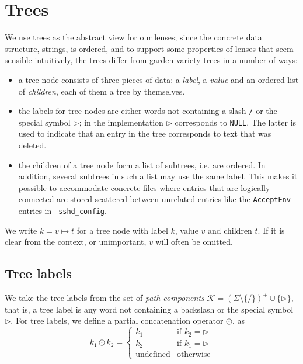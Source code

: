 \documentclass[12pt,fleqn]{amsart}
\newcommand{\ensmath}[1]{\ensuremath{#1}\xspace}
\newcommand{\xconc}[2]{\ensmath{#1\odot #2}}
\newcommand{\tmapv}[3]{\ensmath{#1 = #2\mapsto #3}}
\newcommand{\Keys}{\ensmath{\mathcal{K}}}
\begin{document}
\section{Trees}
We use trees as the abstract view for our lenses; since the concrete data
structure, strings, is ordered, and to support some properties of lenses
that seem sensible intuitively, the trees differ from garden-variety trees
in a number of ways:
\begin{itemize}
  \item a tree node consists of three pieces of data: a \emph{label}, a
    \emph{value} and an ordered list of \emph{children}, each of them a
    tree by themselves.
  \item the labels for tree nodes are either words not containing a slash
    {\tt /} or the special symbol $\rhd$; in the implementation $\rhd$
    corresponds to {\tt NULL}. The latter is used to indicate
    that an entry in the tree corresponds to text that was deleted.
  \item the children of a tree node form a list of subtrees, i.e. are
    ordered. In addition, several subtrees in such a list may use the same
    label. This makes it possible to accommodate concrete files where
    entries that are logically connected are stored scattered between
    unrelated entries like the {\tt AcceptEnv} entries in {\tt
      sshd\_config}.
\end{itemize}

We write $\tmapv{k}{v}{t}$ for a tree node with label $k$, value $v$ and
children $t$. If it is clear from the context, or unimportant, $v$ will
often be omitted.

\subsection{Tree labels}
We take the tree labels from the set of \emph{path components} $\Keys =
(\Sigma \setminus \{ {\mathtt /} \})^+ \cup \{ \rhd \}$, that is,
a tree label is any word not containing a backslash or the special symbol
$\rhd$. For tree labels, we define a partial concatenation operator
$\odot$, as
\begin{equation*}
  \xconc{k_1}{k_2} = \begin{cases}
    k_1 & \text{if } k_2 = \rhd\\
    k_2 & \text{if } k_1 = \rhd\\
    \text{undefined} & \text{otherwise}
  \end{cases}
\end{equation*}
\end{document}
